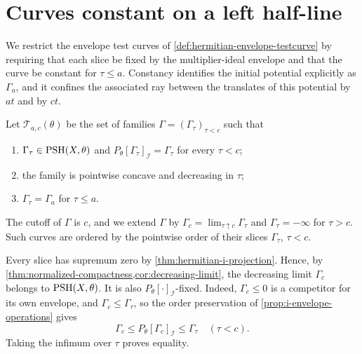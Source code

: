\section{Curves constant on a left half-line}
\label{sec:left-constant-curves}

We restrict the envelope test curves of \cref{def:hermitian-envelope-testcurve} by requiring that each slice be fixed by the multiplier-ideal envelope and that the curve be constant for $\tau\leq a$. Constancy identifies the initial potential explicitly as $\Gamma_a$, and it confines the associated ray between the translates of this potential by $at$ and by $ct$.

\begin{definition}\label{def:bounded-left-i-curve}
Let $\mathscr T_{a,c}(\theta)$ be the set of families $\Gamma=(\Gamma_\tau)_{\tau<c}$ such that
\begin{enumerate}
\item $\Gamma_\tau\in\mathrm{PSH}(X,\theta)$ and $P_\theta[\Gamma_\tau]_{\mathcal I}=\Gamma_\tau$ for every $\tau<c$;
\item the family is pointwise concave and decreasing in $\tau$;
\item $\Gamma_\tau=\Gamma_a$ for $\tau\leq a$.
\end{enumerate}
The cutoff of $\Gamma$ is $c$, and we extend $\Gamma$ by $\Gamma_c=\lim_{\tau\uparrow c}\Gamma_\tau$ and $\Gamma_\tau=-\infty$ for $\tau>c$. Such curves are ordered by the pointwise order of their slices $\Gamma_\tau$, $\tau<c$.
\end{definition}

Every slice has supremum zero by \cref{thm:hermitian-i-projection}. Hence, by \cref{thm:normalized-compactness,cor:decreasing-limit}, the decreasing limit $\Gamma_c$ belongs to $\mathrm{PSH}(X,\theta)$. It is also $P_\theta[\cdot]_{\mathcal I}$-fixed. Indeed, $\Gamma_c\leq0$ is a competitor for its own envelope, and $\Gamma_c\leq\Gamma_\tau$, so the order preservation of \cref{prop:i-envelope-operations} gives
\[
 \Gamma_c\leq P_\theta[\Gamma_c]_{\mathcal I}\leq\Gamma_\tau
 \quad(\tau<c).
\]
Taking the infimum over $\tau$ proves equality.

